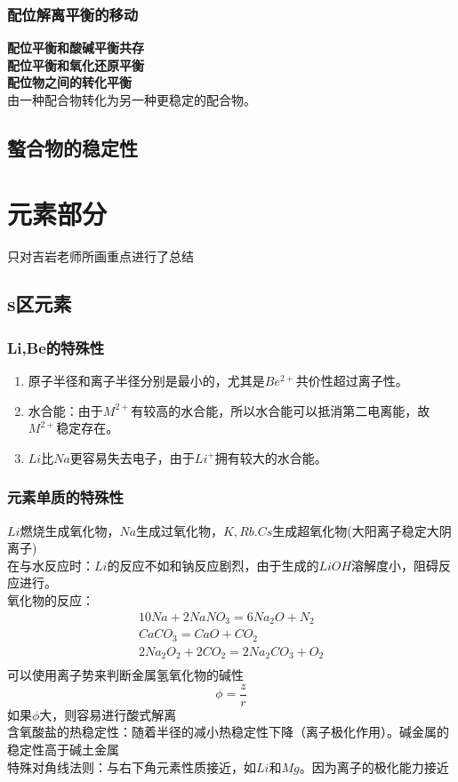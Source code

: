 \documentclass[utf8,a4paper,12pt]{ctexart}
\begin{document}
\subsubsection{配位解离平衡的移动}
{\bf 配位平衡和酸碱平衡共存}\\
{\bf 配位平衡和氧化还原平衡}\\
{\bf 配位物之间的转化平衡}\\
由一种配合物转化为另一种更稳定的配合物。\\
\subsection{螯合物的稳定性}

\newpage
\section{元素部分}
\begin{center}
	{\kaishu 只对吉岩老师所画重点进行了总结}
\end{center}
\subsection{s区元素}
\subsubsection{Li,Be的特殊性}
\begin{enumerate}[(1)]
\item 原子半径和离子半径分别是最小的，尤其是$Be^{2+}$共价性超过离子性。
\item 水合能：由于$M^{2+}$有较高的水合能，所以水合能可以抵消第二电离能，故$M^{2+}$稳定存在。
\item $Li$比$Na$更容易失去电子，由于$Li^{+}$拥有较大的水合能。
\end{enumerate}
\subsubsection{元素单质的特殊性}
$Li$燃烧生成氧化物，$Na$生成过氧化物，$K,Rb.Cs$生成超氧化物(大阳离子稳定大阴离子)\\
在与水反应时：$Li$的反应不如和钠反应剧烈，由于生成的$LiOH$溶解度小，阻碍反应进行。\\
氧化物的反应：
\begin{align*}
10Na + 2NaNO_3 = 6Na_2O + N_2\\
CaCO_3 = CaO + CO_2\\
2Na_2O_2 + 2CO_2 = 2Na_2CO_3 + O_2\\
\end{align*}
可以使用离子势来判断金属氢氧化物的碱性
\[\phi = \frac{z}{r}\]
如果$\phi$大，则容易进行酸式解离\\
含氧酸盐的热稳定性：随着半径的减小热稳定性下降（离子极化作用）。碱金属的稳定性高于碱土金属\\
特殊对角线法则：与右下角元素性质接近，如$Li$和$Mg$。因为离子的极化能力接近\\
\end{document}
